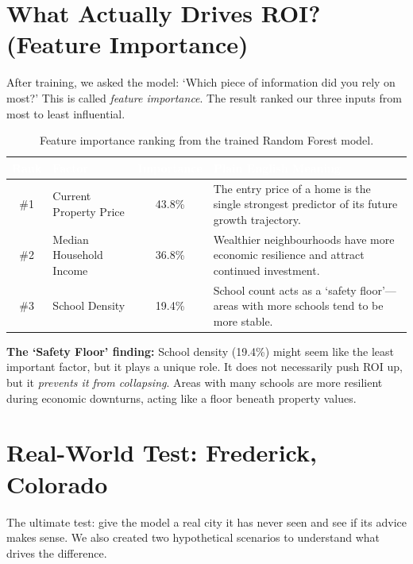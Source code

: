 \documentclass[12pt, a4paper]{article}
\newcommand{\hrow}{\rowcolor{rowblue}}
\begin{document}
\section{What Actually Drives ROI? (Feature Importance)}

After training, we asked the model: `Which piece of information did you rely on most?' This is called
\textit{feature importance}. The result ranked our three inputs from most to least influential.

\begin{table}[H]
\centering
\renewcommand{\arraystretch}{1.4}
\begin{tabularx}{\linewidth}{clcX}
\toprule
\rowcolor{headerblue}
\textcolor{white}{\textbf{Rank}} &
\textcolor{white}{\textbf{Factor}} &
\textcolor{white}{\textbf{Importance}} &
\textcolor{white}{\textbf{Plain English Meaning}} \\
\midrule
\#1 & Current Property Price   & 43.8\% & The entry price of a home is the single strongest predictor of its future growth trajectory. \\
\hrow \#2 & Median Household Income  & 36.8\% & Wealthier neighbourhoods have more economic resilience and attract continued investment. \\
\#3 & School Density           & 19.4\% & School count acts as a `safety floor'---areas with more schools tend to be more stable. \\
\bottomrule
\end{tabularx}
\caption{Feature importance ranking from the trained Random Forest model.}
\end{table}

\textbf{The `Safety Floor' finding:} School density (19.4\%) might seem like the least important factor, but it
plays a unique role. It does not necessarily push ROI up, but it \textit{prevents it from collapsing}. Areas with
many schools are more resilient during economic downturns, acting like a floor beneath property values.

\section{Real-World Test: Frederick, Colorado}

The ultimate test: give the model a real city it has never seen and see if its advice makes sense. We also created
two hypothetical scenarios to understand what drives the difference.
\end{document}
